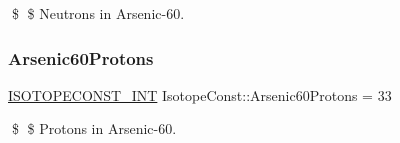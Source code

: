 \$ \$ Neutrons in Arsenic-\/60. \mbox{\label{group___isotope_const-_arsenic-_as60_gac1a0fa1e35933873bb95dacb6031602b}} 
\subsubsection{\texorpdfstring{Arsenic60\+Protons}{Arsenic60Protons}}
{\footnotesize\ttfamily \mbox{\hyperlink{group___isotope_const-_macros_ga5f18360b3e99483a35c32d789e62621c}{I\+S\+O\+T\+O\+P\+E\+C\+O\+N\+S\+T\+\_\+\+I\+NT}} Isotope\+Const\+::\+Arsenic60\+Protons = 33}

\$ \$ Protons in Arsenic-\/60. 